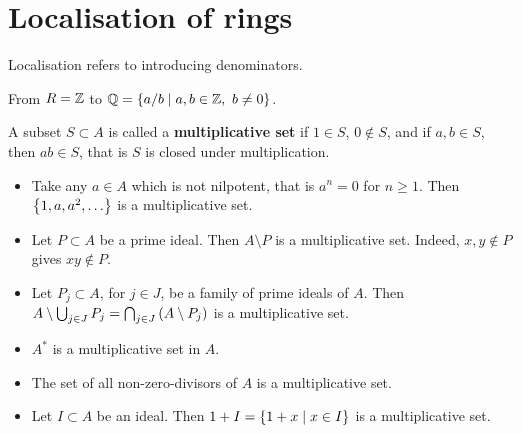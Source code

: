 \pagebreak

\section{Localisation of rings}

Localisation refers to introducing denominators.

\begin{example*}
From $ R = \mathbb{Z} $ to $ \mathbb{Q} = \left\{ a / b \mid a, b \in \mathbb{Z}, \ b \ne 0 \right\} $.
\end{example*}

\begin{definition}
A subset $ S \subset A $ is called a \textbf{multiplicative set} if $ 1 \in S $, $ 0 \not\in S $, and if $ a, b \in S $, then $ ab \in S $, that is $ S $ is closed under multiplication.
\end{definition}

\begin{example*}
\hfill
\begin{itemize}
\item Take any $ a \in A $ which is not nilpotent, that is $ a^n = 0 $ for $ n \ge 1 $. Then $ \cb{1, a, a^2, \dots} $ is a multiplicative set.
\item Let $ P \subset A $ be a prime ideal. Then $ A \setminus P $ is a multiplicative set. Indeed, $ x, y \notin P $ gives $ xy \notin P $.
\item Let $ P_j \subset A $, for $ j \in J $, be a family of prime ideals of $ A $. Then $ A \setminus \bigcup_{j \in J} P_j = \bigcap_{j \in J} \left( A \setminus P_j \right) $ is a multiplicative set.
\item $ A^* $ is a multiplicative set in $ A $.
\item The set of all non-zero-divisors of $ A $ is a multiplicative set.
\item Let $ I \subset A $ be an ideal. Then $ 1 + I = \left\{ 1 + x \mid x \in I \right\} $ is a multiplicative set.
\end{itemize}
\end{example*}

